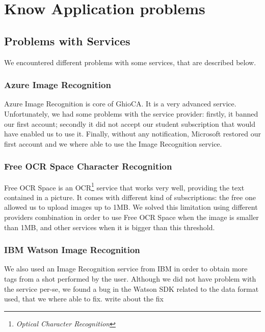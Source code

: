 \section{Know Application problems}
\label{sec:issues}

\subsection{Problems with Services}

We encountered different problems with some services, that are described below.

\subsubsection{Azure Image Recognition}

Azure Image Recognition is core of GhioCA. It is a very advanced service.
Unfortunately, we had some problems with the service provider: firstly,
it banned our first account; secondly it did not accept our student
subscription that would have enabled us to use it.
Finally, without any notification, Microsoft restored our first account and we
where able to use the Image Recognition service.

\subsubsection{Free OCR Space Character Recognition}

Free OCR Space is an OCR\footnote{\textit{Optical Character 
Recognition}} service that works very well, providing the text contained in a 
picture.
It comes with different kind of subscriptions: the free one allowed us to upload
images up to 1MB. 
We solved this limitation using different providers combination in order to use
Free OCR Space when the image is smaller than 1MB, and other services 
when it is bigger than this threshold.

\subsubsection{IBM Watson Image Recognition}

We also used an Image Recognition service from IBM in order to obtain more tags
from a shot performed by the user. %
Although we did not have problem with the service per-se, we found a bug in the 
Watson SDK related to the data format used, that we where able to fix. %
write about the fix

